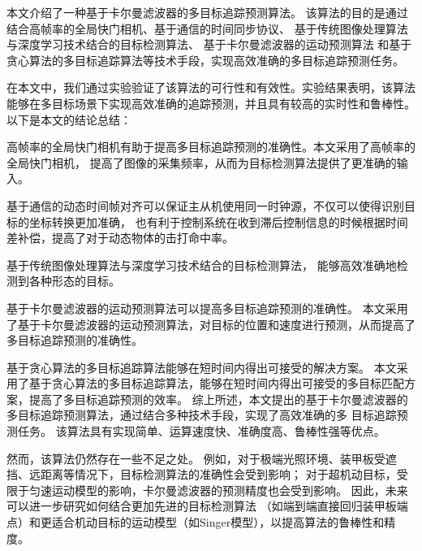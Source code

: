 


\begin{conclusions}

本文介绍了一种基于卡尔曼滤波器的多目标追踪预测算法。
该算法的目的是通过结合高帧率的全局快门相机、基于通信的时间同步协议、
基于传统图像处理算法与深度学习技术结合的目标检测算法、
基于卡尔曼滤波器的运动预测算法
和基于贪心算法的多目标追踪算法等技术手段，实现高效准确的多目标追踪预测任务。

在本文中，我们通过实验验证了该算法的可行性和有效性。实验结果表明，该算法能够在多目标场景下实现高效准确的追踪预测，并且具有较高的实时性和鲁棒性。以下是本文的结论总结：

高帧率的全局快门相机有助于提高多目标追踪预测的准确性。本文采用了高帧率的全局快门相机，
提高了图像的采集频率，从而为目标检测算法提供了更准确的输入。

基于通信的动态时间帧对齐可以保证主从机使用同一时钟源，不仅可以使得识别目标的坐标转换更加准确，
也有利于控制系统在收到滞后控制信息的时候根据时间差补偿，提高了对于动态物体的击打命中率。

基于传统图像处理算法与深度学习技术结合的目标检测算法，
能够高效准确地检测到各种形态的目标。

基于卡尔曼滤波器的运动预测算法可以提高多目标追踪预测的准确性。
本文采用了基于卡尔曼滤波器的运动预测算法，对目标的位置和速度进行预测，从而提高了多目标追踪预测的准确性。

基于贪心算法的多目标追踪算法能够在短时间内得出可接受的解决方案。
本文采用了基于贪心算法的多目标追踪算法，能够在短时间内得出可接受的多目标匹配方案，提高了多目标追踪预测的效率。
综上所述，本文提出的基于卡尔曼滤波器的多目标追踪预测算法，通过结合多种技术手段，实现了高效准确的多
目标追踪预测任务。
该算法具有实现简单、运算速度快、准确度高、鲁棒性强等优点。

然而，该算法仍然存在一些不足之处。
例如，对于极端光照环境、装甲板受遮挡、远距离等情况下，目标检测算法的准确性会受到影响；
对于超机动目标，受限于匀速运动模型的影响，卡尔曼滤波器的预测精度也会受到影响。
因此，未来可以进一步研究如何结合更加先进的目标检测算法
（如端到端直接回归装甲板端点）和更适合机动目标的运动模型（如Singer\cite{2013A}模型），以提高算法的鲁棒性和精度。



\end{conclusions}
